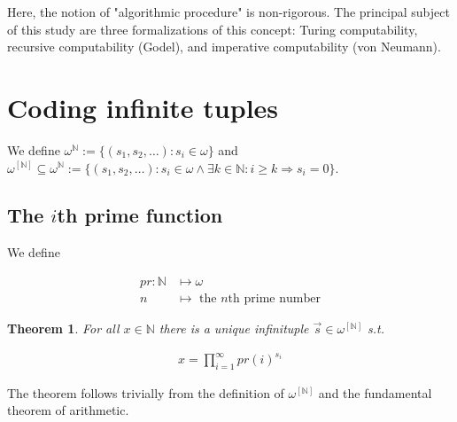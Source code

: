 \documentclass[a4paper, 12pt]{article}
\newtheorem{theorem}{Theorem}
\newtheorem{theorem}{Theorem}
\begin{document}
Here, the notion of "algorithmic procedure" is non-rigorous. The principal
subject of this study are three formalizations of this concept: Turing
computability, recursive computability (Godel), and imperative
computability (von Neumann).

\pagebreak

\section{Coding infinite tuples}

We define $\omega^{\mathbb{N}} := \{ (s_1, s_2, \ldots) : s_i \in \omega \}$ and
$\omega^{\left[ \mathbb{N} \right] } \subseteq \omega^{\mathbb{N}} := \{(s_1,
s_2, \ldots) : s_i \in \omega \land \exists k \in \mathbb{N} : i \geq k
\Rightarrow s_i = 0\}$. 

\subsection{The $i$th prime function}

We define 

\begin{align*}
    pr : \mathbb{N} &\mapsto \omega  \\ 
    n &\mapsto \text{ the $n$th prime number}
\end{align*}

\begin{theorem}
    For all $x \in \mathbb{N}$ there is a unique infinituple $\overrightarrow{s}
    \in \omega^{[\mathbb{N}]}$ s.t. 

    \begin{align*}
        x = \prod_{i=1}^{\infty} pr(i)^{s_i}
    \end{align*}
\end{theorem}

The theorem follows trivially from the definition of $\omega^{[\mathbb{N}]}$ and
the fundamental theorem of arithmetic. 
\end{document}
